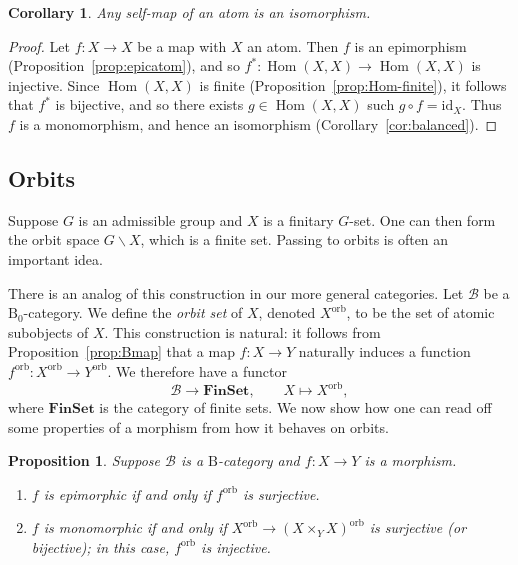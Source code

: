 \documentclass[12pt]{amsart}
\numberwithin{equation}{section}
\newtheorem{proposition}[equation]{Proposition}
\newtheorem{corollary}[equation]{Corollary}
\theoremstyle{definition}
\newcommand{\cB}{\mathcal{B}}
\newcommand{\rB}{\mathrm{B}}
\newcommand{\defn}[1]{\emph{#1}}
\DeclareMathOperator{\Hom}{Hom}
\newcommand{\id}{\mathrm{id}}
\newcommand{\orb}{\mathrm{orb}}
\newcommand{\FinSet}{\mathbf{FinSet}}
\begin{document}
\begin{corollary} \label{cor:EI-atom}
Any self-map of an atom is an isomorphism.
\end{corollary}

\begin{proof}
Let $f \colon X \to X$ be a map with $X$ an atom. Then $f$ is an epimorphism (Proposition~\ref{prop:epicatom}), and so $f^* \colon \Hom(X,X) \to \Hom(X,X)$ is injective. Since $\Hom(X,X)$ is finite (Proposition~\ref{prop:Hom-finite}), it follows that $f^*$ is bijective, and so there exists $g \in \Hom(X,X)$ such $g \circ f = \id_X$. Thus $f$ is a monomorphism, and hence an isomorphism (Corollary~\ref{cor:balanced}).
\end{proof}

\subsection{Orbits} \label{ss:orb}

Suppose $G$ is an admissible group and $X$ is a finitary $G$-set. One can then form the orbit space $G \backslash X$, which is a finite set. Passing to orbits is often an important idea.

There is an analog of this construction in our more general categories. Let $\cB$ be a $\rB_0$-category. We define the \defn{orbit set} of $X$, denoted $X^{\orb}$, to be the set of atomic subobjects of $X$. This construction is natural: it follows from Proposition~\ref{prop:Bmap} that a map $f \colon X \to Y$ naturally induces a function $f^{\orb} \colon X^{\orb} \to Y^{\orb}$. We therefore have a functor
\begin{displaymath}
\cB \to \FinSet, \qquad X \mapsto X^{\orb},
\end{displaymath}
where $\FinSet$ is the category of finite sets. We now show how one can read off some properties of a morphism from how it behaves on orbits.

\begin{proposition} \label{prop:orb-mono}
Suppose $\cB$ is a $\rB$-category and $f \colon X \to Y$ is a morphism.
\begin{enumerate}
\item $f$ is epimorphic if and only if $f^{\orb}$ is surjective.
\item $f$ is monomorphic if and only if $X^{\orb} \to (X \times_Y X)^{\orb}$ is surjective (or bijective); in this case, $f^{\orb}$ is injective.
\end{enumerate}
\end{proposition}
\end{document}
